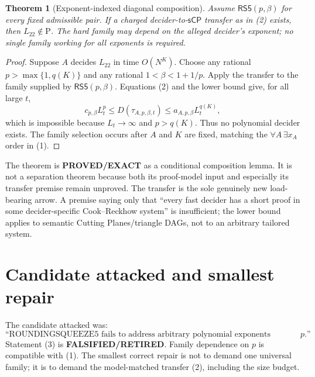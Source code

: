 \documentclass[11pt]{article}
\newtheorem{theorem}{Theorem}
\newcommand{\Ltwo}{L_{22}}
\newcommand{\sCP}{\mathsf{sCP}}
\newcommand{\EXACT}{\textbf{PROVED/EXACT}}
\newcommand{\RET}{\textbf{FALSIFIED/RETIRED}}
\begin{document}
\begin{theorem}[Exponent-indexed diagonal composition]
Assume $\mathsf{RS5}(p,\beta)$ for every fixed admissible pair. If a charged
decider-to-$\sCP$ transfer as in (2) exists, then $\Ltwo\notin\mathrm P$.
The hard family may depend on the alleged decider's exponent; no single
family working for all exponents is required.
\end{theorem}
\begin{proof}
Suppose $A$ decides $\Ltwo$ in time $O(N^K)$. Choose any rational
$p>\max\{1,q(K)\}$ and any rational
$1<\beta<1+1/p$. Apply the transfer to the family supplied by
$\mathsf{RS5}(p,\beta)$. Equations (2) and the lower bound give, for all
large $t$,
\[
 c_{p,\beta}L_t^p
 \le D(\tau_{A,p,\beta,t})
 \le a_{A,p,\beta}L_t^{q(K)},
\]
which is impossible because $L_t\to\infty$ and $p>q(K)$. Thus no polynomial
decider exists. The family selection occurs after $A$ and $K$ are fixed,
matching the $\forall A\,\exists x_A$ order in (1).
\end{proof}

The theorem is \EXACT{} as a conditional composition lemma. It is not a
separation theorem because both its proof-model input and especially its
transfer premise remain unproved. The transfer is the sole genuinely new
load-bearing arrow. A premise saying only that ``every fast decider has a
short proof in some decider-specific Cook--Reckhow system'' is insufficient;
the lower bound applies to semantic Cutting Planes/triangle DAGs, not to an
arbitrary tailored system.

\section{Candidate attacked and smallest repair}
The candidate attacked was:
\[
 \text{``ROUNDINGSQUEEZE5 fails to address arbitrary polynomial exponents
 because its family depends on }p\text{.''}               \tag{3}
\]
Statement (3) is \RET{}. Family dependence on $p$ is compatible with (1).
The smallest correct repair is not to demand one universal family; it is to
demand the model-matched transfer (2), including the size budget.
\end{document}
